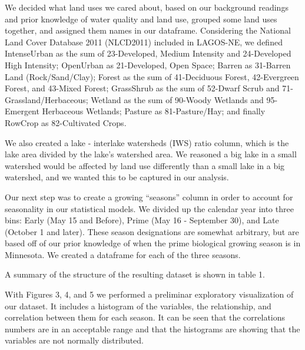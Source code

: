 \documentclass[12pt,]{article}
\begin{document}
We decided what land uses we cared about, based on our background
readings and prior knowledge of water quality and land use, grouped some
land uses together, and assigned them names in our dataframe.
Considering the National Land Cover Database 2011 (NLCD2011) included in
LAGOS-NE, we defined IntenseUrban as the sum of 23-Developed, Medium
Intensity and 24-Developed High Intensity; OpenUrban as 21-Developed,
Open Space; Barren as 31-Barren Land (Rock/Sand/Clay); Forest as the sum
of 41-Deciduous Forest, 42-Evergreen Forest, and 43-Mixed Forest;
GrassShrub as the sum of 52-Dwarf Scrub and 71-Grassland/Herbaceous;
Wetland as the sum of 90-Woody Wetlands and 95-Emergent Herbaceous
Wetlands; Pasture as 81-Pasture/Hay; and finally RowCrop as
82-Cultivated Crops.

We also created a lake - interlake watersheds (IWS) ratio column, which
is the lake area divided by the lake's watershed area. We reasoned a big
lake in a small watershed would be affected by land use differently than
a small lake in a big watershed, and we wanted this to be captured in
our analysis.

Our next step was to create a growing ``seasons'' column in order to
account for seasonality in our statistical models. We divided up the
calendar year into three bins: Early (May 15 and Before), Prime (May 16
- September 30), and Late (October 1 and later). These season
designations are somewhat arbitrary, but are based off of our prior
knowledge of when the prime biological growing season is in Minnesota.
We created a dataframe for each of the three seasons.

A summary of the structure of the resulting dataset is shown in table 1.

With Figures 3, 4, and 5 we performed a preliminar exploratory
visualization of our dataset. It includes a histogram of the variables,
the relationship, and correlation between them for each season. It can
be seen that the correlations numbers are in an acceptable range and
that the histograms are showing that the variables are not normally
distributed.
\end{document}
